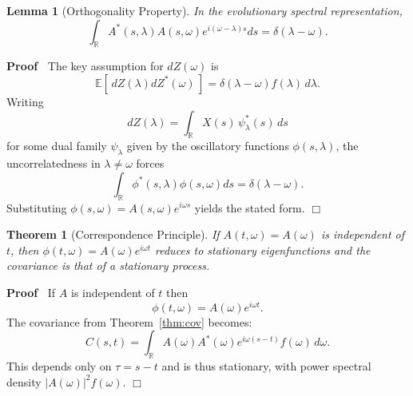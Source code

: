 \documentclass{article}
\newenvironment{proof}{\noindent\textbf{Proof\ }}{\hspace*{\fill}$\Box$\medskip}
\newtheorem{lemma}{Lemma}
\newtheorem{theorem}{Theorem}
\begin{document}
\begin{lemma}
  [Orthogonality Property]
  In the evolutionary spectral representation,
  \[
  \int_{\mathbb{R}} A^{\ast} (s, \lambda) A (s, \omega) e^{i (\omega-\lambda) s} ds = \delta (\lambda - \omega).
  \]
\end{lemma}

\begin{proof}
The key assumption for $dZ(\omega)$ is
\[
\mathbb{E}[\, dZ(\lambda) dZ^*(\omega) \,] = \delta(\lambda-\omega) f(\lambda) \, d\lambda.
\]
Writing
\[
dZ(\lambda) = \int_{\mathbb{R}} X(s) \, \psi^*_\lambda(s) \, ds
\]
for some dual family $\psi_\lambda$ given by the oscillatory functions $\phi(s,\lambda)$, the uncorrelatedness in $\lambda\neq\omega$ forces
\[
\int_{\mathbb{R}} \phi^*(s,\lambda) \phi(s,\omega) ds = \delta(\lambda-\omega).
\]
Substituting $\phi(s,\omega) = A(s,\omega)e^{i\omega s}$ yields the stated form.
\end{proof}

\begin{theorem}
  [Correspondence Principle]
  If $A(t,\omega) = A(\omega)$ is independent of $t$, then $\phi(t,\omega) = A(\omega) e^{i\omega t}$ reduces to stationary eigenfunctions and the covariance is that of a stationary process.
\end{theorem}

\begin{proof}
If $A$ is independent of $t$ then
\[
\phi(t,\omega) = A(\omega) e^{i \omega t}.
\]
The covariance from Theorem~\ref{thm:cov} becomes:
\[
C(s,t) = \int_{\mathbb{R}} A(\omega) A^*(\omega) e^{i\omega(s-t)} f(\omega)\, d\omega.
\]
This depends only on $\tau = s-t$ and is thus stationary, with power spectral density $|A(\omega)|^2 f(\omega)$.
\end{proof}
\end{document}
